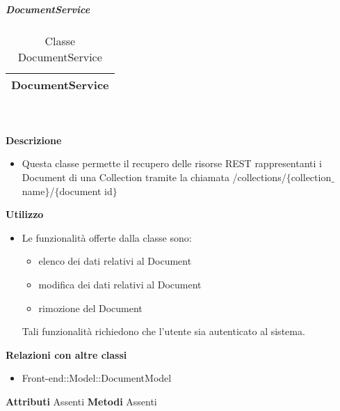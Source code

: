 			\subparagraph{DocumentService} 
\begin{table}[ht]
\begin{center}
\bgroup
	\setlength{\arrayrulewidth}{0.6mm}
	\def\arraystretch{1}
		\begin{tabular}{ | p{12cm} | }
				\hline  
					\centerline{\textbf{DocumentService}}
		\\ \hline 
				\hline
				\hline
		
		\end{tabular}
\egroup
\caption{Classe DocumentService}
\end{center}
\end{table} \textbf{\\ \\ Descrizione}
\begin{itemize}
\item[] Questa classe permette il recupero delle risorse REST rappresentanti i Document di una Collection tramite la chiamata /collections/$\{$collection$\_$name$\}$/$\{$document id$\}$
\end{itemize} 
\textbf{Utilizzo}
\begin{itemize}
\item[] Le funzionalità offerte dalla classe sono: 
\begin{itemize} 
\item elenco dei dati relativi al Document 
\item modifica dei dati relativi al Document
\item rimozione del Document 
\end{itemize} 
Tali funzionalità richiedono che l'utente sia autenticato al sistema.
\end{itemize}
\textbf{Relazioni con altre classi}
\begin{itemize}
\item{Front-end::Model::DocumentModel}
\end{itemize}
\textbf{Attributi}
Assenti
\textbf{Metodi}
Assenti

